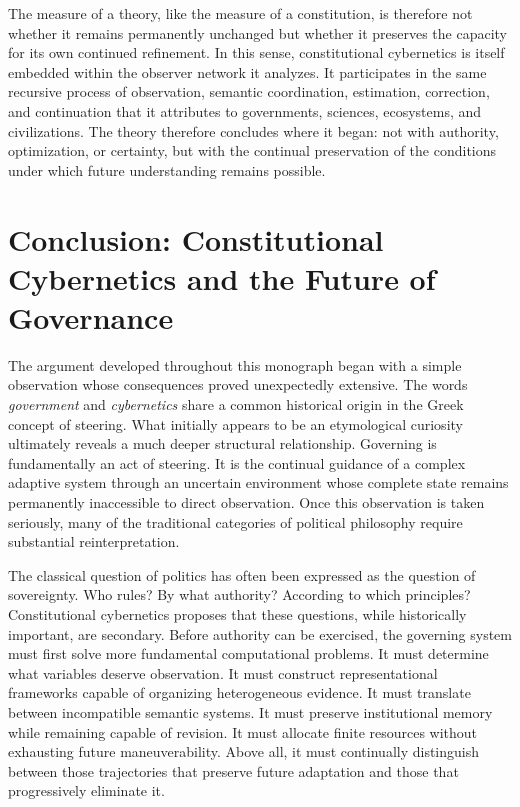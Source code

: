 \documentclass[12pt,a4paper]{article}
\begin{document}
The measure of a theory, like the measure of a constitution, is therefore not whether it remains permanently unchanged but whether it preserves the capacity for its own continued refinement. In this sense, constitutional cybernetics is itself embedded within the observer network it analyzes. It participates in the same recursive process of observation, semantic coordination, estimation, correction, and continuation that it attributes to governments, sciences, ecosystems, and civilizations. The theory therefore concludes where it began: not with authority, optimization, or certainty, but with the continual preservation of the conditions under which future understanding remains possible.

\section{Conclusion: Constitutional Cybernetics and the Future of Governance}

The argument developed throughout this monograph began with a simple observation whose consequences proved unexpectedly extensive. The words \emph{government} and \emph{cybernetics} share a common historical origin in the Greek concept of steering. What initially appears to be an etymological curiosity ultimately reveals a much deeper structural relationship. Governing is fundamentally an act of steering. It is the continual guidance of a complex adaptive system through an uncertain environment whose complete state remains permanently inaccessible to direct observation. Once this observation is taken seriously, many of the traditional categories of political philosophy require substantial reinterpretation.

The classical question of politics has often been expressed as the question of sovereignty. Who rules? By what authority? According to which principles? Constitutional cybernetics proposes that these questions, while historically important, are secondary. Before authority can be exercised, the governing system must first solve more fundamental computational problems. It must determine what variables deserve observation. It must construct representational frameworks capable of organizing heterogeneous evidence. It must translate between incompatible semantic systems. It must preserve institutional memory while remaining capable of revision. It must allocate finite resources without exhausting future maneuverability. Above all, it must continually distinguish between those trajectories that preserve future adaptation and those that progressively eliminate it.
\end{document}
